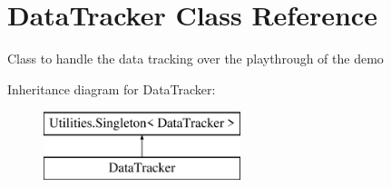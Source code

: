 \hypertarget{class_data_tracker}{}\section{Data\+Tracker Class Reference}
\label{class_data_tracker}


Class to handle the data tracking over the playthrough of the demo  


Inheritance diagram for Data\+Tracker\+:\begin{figure}[H]
\begin{center}
\leavevmode
\includegraphics[height=2.000000cm]{class_data_tracker}
\end{center}
\end{figure}
